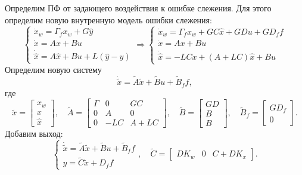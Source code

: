 Определим ПФ от задающего воздействия к ошибке слежения. Для этого определим новую 
внутренную модель ошибки слежения:
\begin{equation*}
    \begin{cases}
        \dot x_w=\Gamma_fx_w+G\hat y\\
        \dot x=Ax+Bu\\
        \dot{\hat x}=A\hat x+Bu+L(\hat y - y)
    \end{cases}\Rightarrow
    \begin{cases}
        \dot x_w=\Gamma_fx_w+GC\hat x+GDu+GD_ff\\
        \dot x=Ax+Bu\\
        \dot{\hat x}=-LCx+(A+LC)\hat x+Bu
    \end{cases}
\end{equation*}
Определим новую систему
\begin{equation*}
    \dot{\tilde x}=\tilde A\tilde x+\tilde B u+\tilde B_ff,
\end{equation*}
где
\begin{equation*}
    \tilde x=\begin{bmatrix}
        x_w\\x\\ \hat x
    \end{bmatrix},\quad
    \tilde A=\begin{bmatrix}
        \Gamma&0&GC\\0&A&0\\0&-LC&A+LC
    \end{bmatrix},\quad
    \tilde B=\begin{bmatrix}
        GD\\B\\B
    \end{bmatrix},\quad
    \tilde B_f=\begin{bmatrix}
        GD_f\\0
    \end{bmatrix}.
\end{equation*}
Добавим выход:
\begin{equation*}
    \begin{cases}
        \dot{\tilde x}=\tilde A\tilde x+\tilde B u+\tilde B_ff\\
        y=\tilde{C}\tilde x+D_ff
    \end{cases},\quad
    \tilde C=\begin{bmatrix}
        DK_w&0&C+DK_x
    \end{bmatrix}.
\end{equation*}
